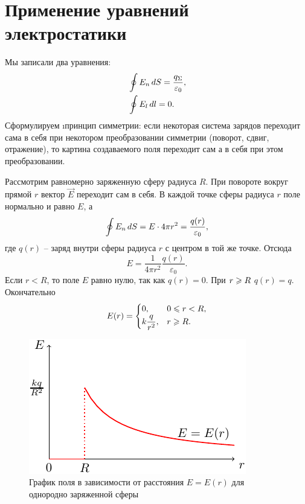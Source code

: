 \section{Применение уравнений электростатики}

	Мы записали два уравнения:
	\begin{eqnarray}
		& \oint E_n \,d S=\dfrac{q_{\Sigma}}{\varepsilon_0}, \\
		& \oint E_l \,d l=0.
	\end{eqnarray}
	Сформулируем \i{принцип симметрии}: если некоторая система зарядов переходит сама в себя при некотором преобразовании симметрии (поворот, сдвиг, отражение), то картина создаваемого поля переходит сам а в себя при этом преобразовании. \par

	Рассмотрим равномерно заряженную сферу  радиуса $R$. При повороте вокруг прямой $r$ вектор $\vec{E}$ переходит сам в себя. В каждой точке сферы радиуса $r$ поле  нормально и равно $E$, а 
	\begin{equation}
		\oint E_n \,d S=E\cdot 4\pi r^2=\frac{q(r)}{\varepsilon_0},
	\end{equation}
	где $q(r)$ -- заряд внутри сферы радиуса $r$ с центром в той же точке. Отсюда
	\begin{equation}
		E=\frac{1}{4\pi r^2}\frac{q(r)}{\varepsilon_0}.
	\end{equation}
	Если $r<R$, то поле $E$ равно нулю, так как $q(r)=0$. При $r\geqslant R$ $q(r)=q$. Окончательно
	\begin{equation}
		E(r)=\begin{cases}
					0,& \text{$0\leqslant r<R$},\\
					k\dfrac{q}{r^2},& \text{$r\geqslant R$}.
				\end{cases}
	\end{equation}
	\begin{figure}
		\centering
		\includegraphics[scale=2]{./img/plot1/plot1.pdf}
		\caption{График поля в зависимости от расстояния $E=E(r)$ для однородно заряженной сферы}
	\end{figure}
